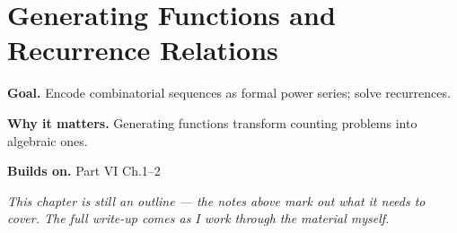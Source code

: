 \chapter{Generating Functions and Recurrence Relations}
\label{ch:06-combinatorics-and-graph-theory-03}

\begin{chapterintro}
\textbf{Goal.} Encode combinatorial sequences as formal power series; solve recurrences.

\textbf{Why it matters.} Generating functions transform counting problems into algebraic ones.

\textbf{Builds on.} Part VI Ch.1–2
\end{chapterintro}

\textit{This chapter is still an outline --- the notes above mark out what it needs to cover. The full write-up comes as I work through the material myself.}
